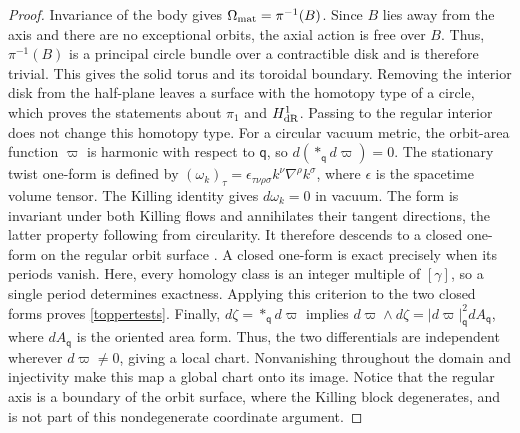 \documentclass[amsmath,amsfonts,amssymb,aps,pra,superscriptaddress,10pt]{revtex4-2}
\numberwithin{equation}{section}
\theoremstyle{plain}
\theoremstyle{definition}
\theoremstyle{remark}
\theoremstyle{definition}
\begin{document}
\begin{proof}
Invariance of the body gives $\Omega_{\rm{mat}}=\pi^{-1}(B)$. Since $B$ lies away from the axis and there are no exceptional orbits, the axial action is free over $B$. Thus, $\pi^{-1}(B)$ is a principal circle bundle over a contractible disk and is therefore trivial. This gives the solid torus and its toroidal boundary. Removing the interior disk from the half-plane leaves a surface with the homotopy type of a circle, which proves the statements about $\pi_1$ and $H^1_{\rm{dR}}$. Passing to the regular interior does not change this homotopy type. For a circular vacuum metric, the orbit-area function $\varpi$ is harmonic with respect to $\mathsf{q}$, so $d(*_{\mathsf{q}}d\varpi)=0$. The stationary twist one-form is defined by $(\omega_k)_\tau=\epsilon_{\tau\nu\rho\sigma}k^\nu\nabla^\rho k^\sigma$, where $\epsilon$ is the spacetime volume tensor. The Killing identity gives $d\omega_k=0$ in vacuum. The form is invariant under both Killing flows and annihilates their tangent directions, the latter property following from circularity. It therefore descends to a closed one-form on the regular orbit surface \cite{Wald1984GR,Stephani2003Exact}. A closed one-form is exact precisely when its periods vanish. Here, every homology class is an integer multiple of $[\gamma]$, so a single period determines exactness. Applying this criterion to the two closed forms proves \eqref{toppertests}. Finally, $d\zeta=*_{\mathsf{q}}d\varpi$ implies $d\varpi\wedge d\zeta=|d\varpi|_{\mathsf{q}}^2dA_{\mathsf{q}}$, where $dA_{\mathsf{q}}$ is the oriented area form. Thus, the two differentials are independent wherever $d\varpi\neq 0$, giving a local chart. Nonvanishing throughout the domain and injectivity make this map a global chart onto its image. Notice that the regular axis is a boundary of the orbit surface, where the Killing block degenerates, and is not part of this nondegenerate coordinate argument.
\end{proof}
\end{document}
